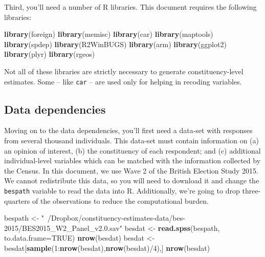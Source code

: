 \documentclass[12pt,twoside]{article}
\newenvironment{Shaded}{}{}
\newcommand{\KeywordTok}[1]{\textcolor[rgb]{0.00,0.44,0.13}{\textbf{{#1}}}}
\newcommand{\DataTypeTok}[1]{\textcolor[rgb]{0.56,0.13,0.00}{{#1}}}
\newcommand{\DecValTok}[1]{\textcolor[rgb]{0.25,0.63,0.44}{{#1}}}
\newcommand{\StringTok}[1]{\textcolor[rgb]{0.25,0.44,0.63}{{#1}}}
\newcommand{\OtherTok}[1]{\textcolor[rgb]{0.00,0.44,0.13}{{#1}}}
\newcommand{\NormalTok}[1]{{#1}}
\begin{document}
Third, you'll need a number of R libraries. This document requires the
following libraries:

\begin{Shaded}
\begin{Highlighting}[]
\KeywordTok{library}\NormalTok{(foreign)}
\KeywordTok{library}\NormalTok{(memisc)}
\KeywordTok{library}\NormalTok{(car)}
\KeywordTok{library}\NormalTok{(maptools)}
\KeywordTok{library}\NormalTok{(spdep)}
\KeywordTok{library}\NormalTok{(R2WinBUGS)}
\KeywordTok{library}\NormalTok{(arm)}
\KeywordTok{library}\NormalTok{(ggplot2)}
\KeywordTok{library}\NormalTok{(plyr)}
\KeywordTok{library}\NormalTok{(rgeos)}
\end{Highlighting}
\end{Shaded}

Not all of these libraries are strictly necessary to generate
constituency-level estimates. Some -- like \texttt{car} -- are used only
for helping in recoding variables.

\subsection{Data dependencies}\label{data-dependencies}

Moving on to the data dependencies, you'll first need a data-set with
responses from several thousand individuals. This data-set must contain
information on (a) an opinion of interest, (b) the constituency of each
respondent; and (c) additional individual-level variables which can be
matched with the information collected by the Census. In this document,
we use Wave 2 of the British Election Study 2015. We cannot redistribute
this data, so you will need to download it and change the
\texttt{bespath} variable to read the data into R. Additionally, we're
going to drop three-quarters of the observations to reduce the
computational burden.

\begin{Shaded}
\begin{Highlighting}[]
\NormalTok{bespath <-}\StringTok{ "~/Dropbox/constituency-estimates-data/bes-2015/BES2015_W2_Panel_v2.0.sav"}
\NormalTok{besdat <-}\StringTok{ }\KeywordTok{read.spss}\NormalTok{(bespath, }
    \DataTypeTok{to.data.frame=}\OtherTok{TRUE}\NormalTok{)}
\KeywordTok{nrow}\NormalTok{(besdat)}
\NormalTok{besdat <-}\StringTok{ }\NormalTok{besdat[}\KeywordTok{sample}\NormalTok{(}\DecValTok{1}\NormalTok{:}\KeywordTok{nrow}\NormalTok{(besdat),}\KeywordTok{nrow}\NormalTok{(besdat)/}\DecValTok{4}\NormalTok{),]}
\KeywordTok{nrow}\NormalTok{(besdat)}
\end{Highlighting}
\end{Shaded}
\end{document}

